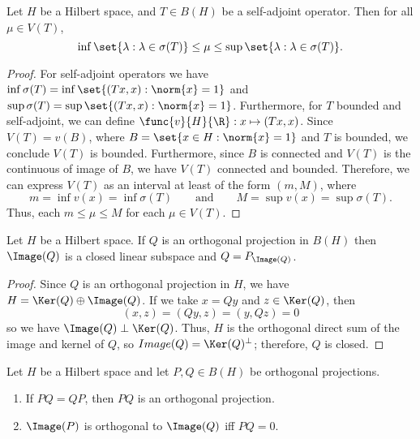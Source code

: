 \documentclass[12pt,letterpaper,twoside]{hmcpset}
\begin{document}
\begin{problem}[3]
  Let $H$ be a Hilbert space, and $T \in B(H)$ be a self-adjoint operator.  Then for all $\mu \in V(T)$,
  \[
  \inf \set{\lambda : \lambda \in \sigma(T)} \leq \mu \leq \sup\set{\lambda : \lambda \in \sigma(T)}.
  \]

\end{problem}

\begin{solution}
  \begin{proof}
    \label{prf:5}
    For self-adjoint operators we have $\inf\sigma(T) = \inf\set{(Tx,x) : \norm{x} = 1}$ and $\sup\sigma(T) = \sup\set{(Tx,x) : \norm{x} =1 }$.
    Furthermore, for $T$ bounded and self-adjoint, we can define $\func{v}{H}{\R} : x \mapsto (Tx, x)$.
    Since $V(T) = v(B)$, where $B = \set{x \in H : \norm{x} = 1}$ and $T$ is bounded, we conclude $V(T)$ is bounded.
    Furthermore, since $B$ is connected and $V(T)$ is the continuous of image of $B$, we have $V(T)$ connected and bounded.
    Therefore, we can express $V(T)$ as an interval at least of the form $(m,M)$, where \[
    m = \inf v(x) = \inf\sigma(T) \qquad \text{and} \qquad M = \sup v(x) = \sup\sigma(T).
    \]
    Thus, each $m \leq \mu \leq M$ for each $\mu \in V(T)$.
  \end{proof}
\end{solution}

\begin{problem}[4]
  Let $H$ be a Hilbert space.  If $Q$ is an orthogonal projection in $B(H)$ then $\Image(Q)$ is a closed linear subspace and $Q = P_{\Image(Q)}$.
\end{problem}

\begin{solution}
  \begin{proof}
    \label{prf:2}
    Since $Q$ is an orthogonal projection in $H$, we have $H = \Ker(Q) \oplus \Image(Q)$.
    If we take $x = Qy$ and $z \in \Ker(Q)$, then \[
    (x,z) = (Qy,z) = (y, Qz) = 0
    \]
    so we have $\Image(Q) \perp \Ker(Q)$.
    Thus, $H$ is the orthogonal direct sum of the image and kernel of $Q$, so $Image(Q) = \Ker(Q)^\perp$; therefore, $Q$ is closed.
  \end{proof}
\end{solution}

\begin{problem}[5]
  Let $H$ be a Hilbert space and let $P,Q \in B(H)$ be orthogonal projections.
  \begin{enumerate}[label=(\alph*)]
  \item If $PQ = QP$, then $PQ$ is an orthogonal projection.
  \item $\Image(P)$ is orthogonal to $\Image(Q)$ iff $PQ = 0$.
  \end{enumerate}
\end{problem}
\end{document}
